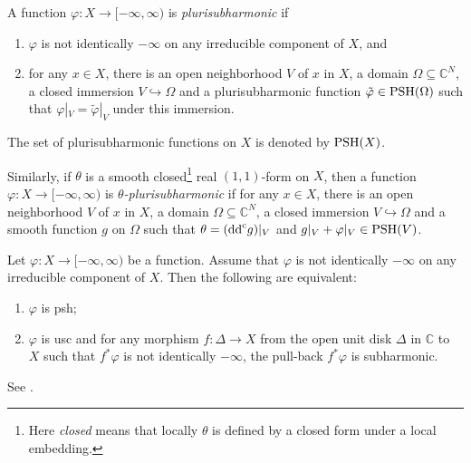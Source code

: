 \begin{definition}\label{def:unibranch:L105}
    A function $\varphi\colon X\rightarrow [-\infty,\infty)$ is \emph{plurisubharmonic} if
	\begin{enumerate}
		\item\label{itm:appendix-unibranch:L107:1} $\varphi$ is not identically $-\infty$ on any irreducible component of $X$, and
		\item\label{itm:appendix-unibranch:L107:2} for any $x\in X$, there is an open neighborhood $V$ of $x$ in $X$, a domain $\Omega\subseteq \mathbb{C}^N$, a closed immersion $V\hookrightarrow \Omega$ and a plurisubharmonic function $\tilde{\varphi}\in \mathrm{PSH}(\Omega)$ such that $\varphi|_V=\tilde{\varphi}|_V$ under this immersion.
	\end{enumerate}
	The set of plurisubharmonic functions on $X$ is denoted by $\mathrm{PSH}(X)$.

    Similarly, if $\theta$ is a smooth closed\footnote{Here \emph{closed} means that locally $\theta$ is defined by a closed form under a local embedding.} real $(1,1)$-form on $X$, then a function $\varphi\colon X\rightarrow [-\infty,\infty)$ is \emph{$\theta$-plurisubharmonic} if for any $x\in X$, there is an open neighborhood $V$ of $x$ in $X$, a domain $\Omega\subseteq \mathbb{C}^N$, a closed immersion $V\hookrightarrow \Omega$ and a smooth function $g$ on $\Omega$ such that $\theta=(\mathrm{dd}^{\mathrm{c}} g)|_V$ and $g|_V+\varphi|_V\in \mathrm{PSH}(V)$.
\end{definition}


\begin{theorem}\label{thm:FN}
	Let $\varphi\colon X\rightarrow [-\infty,\infty)$ be a function. Assume that $\varphi$ is not identically $-\infty$ on any irreducible component of $X$. Then the following are equivalent:
	\begin{enumerate}
		\item\label{itm:thm:FN:1} $\varphi$ is psh;
		\item\label{itm:thm:FN:2} $\varphi$ is usc and for any morphism $f\colon \Delta\rightarrow X$ from the open unit disk $\Delta$ in $\mathbb{C}$ to $X$ such that $f^*\varphi$ is not identically $-\infty$, the pull-back $f^*\varphi$ is subharmonic.
	\end{enumerate}
\end{theorem}
See \cite{FN80}.





